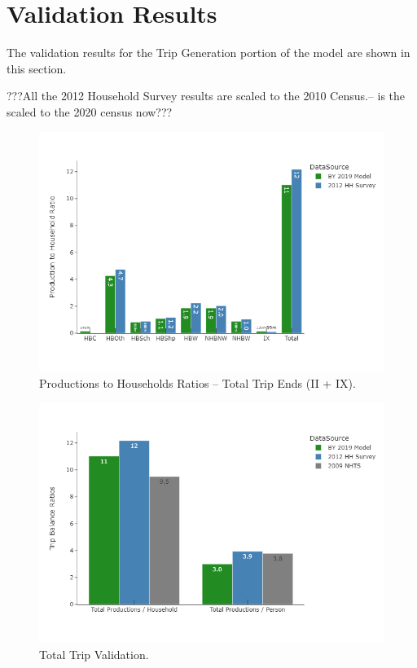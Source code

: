 \documentclass[
  letterpaper,
  DIV=11,
  numbers=noendperiod]{scrreprt}
\begin{document}
\hypertarget{validation-results}{%
\section{Validation Results}\label{validation-results}}

The validation results for the Trip Generation portion of the model are
shown in this section.

???All the 2012 Household Survey results are scaled to the 2010
Census.-- is the scaled to the 2020 census now???

\begin{figure}[H]

{\centering \includegraphics{v9x/v900/validation/_pictures/4-plot1.png}

}

\caption{\label{fig-pdf-prod-hh}Productions to Households Ratios --
Total Trip Ends (II + IX).}

\end{figure}

\begin{figure}[H]

{\centering \includegraphics{v9x/v900/validation/_pictures/4-plot2.png}

}

\caption{\label{fig-pdf-ptrip-valid}Total Trip Validation.}

\end{figure}
\end{document}
